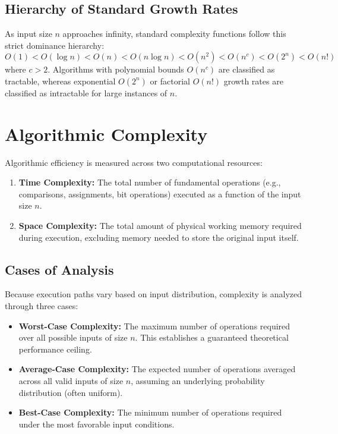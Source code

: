 \documentclass[11pt,a4paper]{article}
\begin{document}
\subsection{Hierarchy of Standard Growth Rates}
As input size $n$ approaches infinity, standard complexity functions follow this strict dominance hierarchy:
\begin{equation}
    O(1) < O(\log n) < O(n) < O(n \log n) < O(n^2) < O(n^c) < O(2^n) < O(n!)
\end{equation}
where $c > 2$. Algorithms with polynomial bounds $O(n^c)$ are classified as tractable, whereas exponential $O(2^n)$ or factorial $O(n!)$ growth rates are classified as intractable for large instances of $n$.

\section{Algorithmic Complexity}
Algorithmic efficiency is measured across two computational resources:
\begin{enumerate}
    \item \textbf{Time Complexity:} The total number of fundamental operations (e.g., comparisons, assignments, bit operations) executed as a function of the input size $n$.
    \item \textbf{Space Complexity:} The total amount of physical working memory required during execution, excluding memory needed to store the original input itself.
\end{enumerate}

\subsection{Cases of Analysis}
Because execution paths vary based on input distribution, complexity is analyzed through three cases:
\begin{itemize}
    \item \textbf{Worst-Case Complexity:} The maximum number of operations required over all possible inputs of size $n$. This establishes a guaranteed theoretical performance ceiling.
    \item \textbf{Average-Case Complexity:} The expected number of operations averaged across all valid inputs of size $n$, assuming an underlying probability distribution (often uniform).
    \item \textbf{Best-Case Complexity:} The minimum number of operations required under the most favorable input conditions.
\end{itemize}
\end{document}
